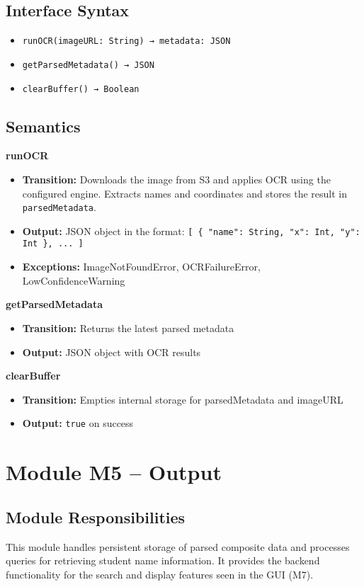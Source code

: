 \documentclass[12pt, titlepage]{article}
\begin{document}
\subsection*{Interface Syntax}
\begin{itemize}
  \item \texttt{runOCR(imageURL: String) → metadata: JSON}
  \item \texttt{getParsedMetadata() → JSON}
  \item \texttt{clearBuffer() → Boolean}
\end{itemize}

\subsection*{Semantics}

\textbf{runOCR}
\begin{itemize}
  \item \textbf{Transition:} Downloads the image from S3 and applies OCR using the configured engine. Extracts names and coordinates and stores the result in \texttt{parsedMetadata}.
  \item \textbf{Output:} JSON object in the format: \texttt{[ \{ "name": String, "x": Int, "y": Int \}, ... ]}
  \item \textbf{Exceptions:} ImageNotFoundError, OCRFailureError, LowConfidenceWarning
\end{itemize}

\textbf{getParsedMetadata}
\begin{itemize}
  \item \textbf{Transition:} Returns the latest parsed metadata
  \item \textbf{Output:} JSON object with OCR results
\end{itemize}

\textbf{clearBuffer}
\begin{itemize}
  \item \textbf{Transition:} Empties internal storage for parsedMetadata and imageURL
  \item \textbf{Output:} \texttt{true} on success
\end{itemize}



\section{Module M5 – Output}
\label{SecM5}

\subsection*{Module Responsibilities}
This module handles persistent storage of parsed composite data and processes queries for retrieving student name information. It provides the backend functionality for the search and display features seen in the GUI (M7).
\end{document}
